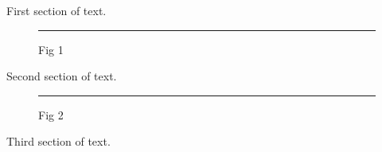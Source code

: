 \documentclass{article}
\begin{document}
First section of text.

\begin{figure}
\centering
\rule{7cm}{1cm}
\caption{Fig 1}
\end{figure}

Second section of text.

\begin{figure}
\centering
\rule{7cm}{1cm}
\caption{Fig 2}
\end{figure}

Third section of text.
\end{document}
